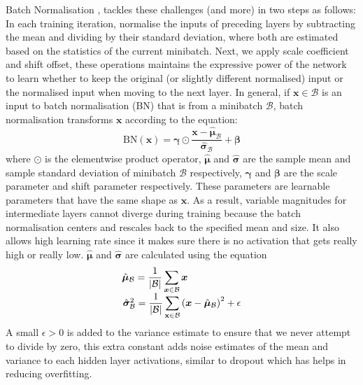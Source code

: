 \documentclass[12pt]{report}
\numberwithin{equation}{section}
\begin{document}
Batch Normalisation {\cite{ioffe15}}, tackles these challenges (and more) in two steps as follows: In each training iteration, normalise the inputs of preceding layers by subtracting the mean and dividing by their standard deviation, where both are estimated based on the statistics of the current minibatch. Next, we apply scale coefficient and shift offset, these operations maintains the expressive power of the network to learn whether to keep the original (or slightly different normalised) input or the normalised input when moving to the next layer. In general, if $\bm{x} \in \mathcal{B}$ is an input to batch normalisation (BN) that is from a minibatch $\mathcal{B}$, batch normalisation transforms $\bm{x}$ according to the equation:
\begin{equation} \label{eqn:batch_norm}
\mathrm{BN}(\bm{x})= \boldsymbol{\gamma} \odot \frac{\bm{x}-\hat{\boldsymbol{\mu}}_{\mathcal{B}}}{\hat{\boldsymbol{\sigma}}_{\mathcal{B}}}+\boldsymbol{\beta}
\end{equation} \noindent
where $\odot$ is the elementwise product operator, $\hat{\boldsymbol{\mu}}$ and $\hat{\boldsymbol{\sigma}}$ are the sample mean and sample standard deviation of minibatch $\mathcal{B}$ respectively, $\boldsymbol{\gamma}$ and $\boldsymbol{\beta}$ are the scale parameter and shift parameter respectively. These parameters are learnable parameters that have the same shape as $\bm{x}$. As a result, variable magnitudes for intermediate layers cannot diverge during training because the batch normalisation centers and rescales back to the specified mean and size. It also allows high learning rate since it makes sure there is no activation that gets really high or really low. $\hat{\boldsymbol{\mu}}$ and $\hat{\boldsymbol{\sigma}}$ are calculated using the equation
\begin{equation}\label{eqn:mean_variance}
\begin{array}{l}
\hat{\boldsymbol{\mu}}_{\mathcal{B}} = \displaystyle \frac{1}{|\mathcal{B}|} \sum_{\bm{x} \in \mathcal{B}} \bm{x} \\
\hskip 1pt
\hat{\boldsymbol{\sigma}}_{\mathcal{B}}^{2} = \displaystyle \frac{1}{|\mathcal{B}|} \sum_{\mathbf{x} \in \mathcal{B}}\left(\bm{x}-\hat{\boldsymbol{\mu}}_{\mathcal{B}}\right)^{2}+\epsilon
\end{array}
\end{equation} \noindent
A small $\epsilon > 0$ is added to the variance estimate to ensure that we never attempt to divide by zero, this extra constant adds noise estimates of the mean and variance to each hidden layer activations, similar to dropout which has helps in reducing overfitting. 
\end{document}
